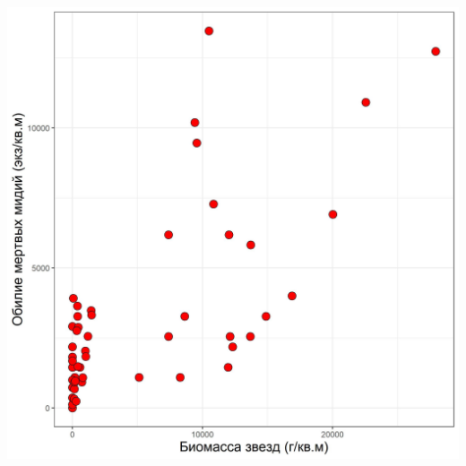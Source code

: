 \documentclass[20pt,a0,portrait]{a0poster}
\begin{document}
\begin{minipage}[t]{0.46\linewidth}
\begin{minipage}[t]{0.46\linewidth}
\begin{center}
			\includegraphics[width=0.9\linewidth]{Baster_N_dead.jpg}
			\label{Baster_Ndead}
		\end{center}\vspace{0.5cm}
\end{minipage}



\end{minipage}
\end{document}
